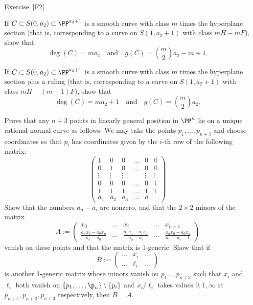 Exercise~\ref{F2}
\begin{exercise}\label{curves on cones}
\item If $C \subset S(0, a_2) \subset \PP^{a_2+1}$ is a smooth curve with class $m$ times the hyperplane section (that is, corresponding to a curve on $S(1,a_2+1)$ with class $mH - mF$), show that
$$
\deg(C) = ma_2 \quad \text{and} \quad g(C) = \binom{m}{2}a_2 - m + 1.
$$
\item If $C \subset S(0, a_2) \subset \PP^{a_2+1}$ is a smooth curve with class $m$ times the hyperplane section plus a ruling (that is, corresponding to a curve on $S(1,a_2+1)$ with class $mH - (m-1)F$), show that
$$
\deg(C) = ma_2 + 1 \quad \text{and} \quad g(C) = \binom{m}{2}a_2.
$$
\end{exercise}

\begin{exercise}\label{n+3 exercise}
Prove that any $n+3$ points in linearly general position in $\PP^n$ lie on a unique rational normal curve as follows:
 We may take the points $p_1,\dots,p_{n+3}$ and choose coordinates so that $p_i$ has coordinates given by the $i$-th row of the following matrix:
$$
\begin{pmatrix}
 1&0&0&\dots&0&0\\
 0&1&0&\dots&0&0\\
 \vdots &\vdots&\vdots&&\vdots&\vdots \\
 0&0&0&\dots&0&1\\
 1&1&1&\dots&1&1\\
 a_1&a_2&a_3&\dots&a
 \end{pmatrix}
$$
Show that the numbers $a_n-a_i$ are nonzero, and that the $2\times 2$ minors of the matrix
$$
A := \begin{pmatrix}
 x_0&\dots&x_i&\dots& x_{n-1}\\
\frac{a_nx_0-a_0x_n}{a_n-a_0}&\dots&\frac{a_nx_i-a_ix_n}{a_n-a_i}&\dots&\frac{a_nx_0-a_0x_n}{a_n-a_n-1} 
\end{pmatrix}
$$
vanish on these points and that the matrix is 1-generic. Show that if 
$$
B:= \begin{pmatrix}
 \dots& x_i&\dots\\
 \dots& \ell_i &\dots
\end{pmatrix}
$$
is another 1-generic matrix whose minors vanish on $p_1\dots, p_{n+3}$ such that $x_i$ and $\ell_i$ both vanish on
$\{p_1,\dots, \p_n\} \setminus \{p_i\}$ and
$x_i/\ell_i$ takes values $0,1,\infty$ at $p_{n+1},p_{n+2},p_{n+3}$ respectively, then $B= A$.
\end{exercise}

